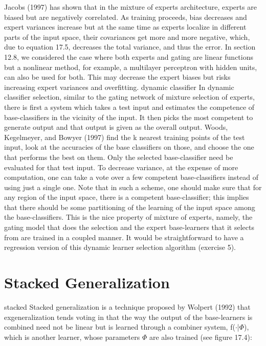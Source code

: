 Jacobs (1997) has shown that in the mixture of experts architecture, experts are biased but are negatively correlated. As training proceeds, bias decreases and expert variances increase but at the same time as experts localize in different parts of the input space, their covariances get more and more negative, which, due to equation 17.5, decreases the total variance, and thus the error. In section 12.8, we considered the case where both experts and gating are linear functions but a nonlinear method, for example, a multilayer perceptron with hidden units, can also be used for both. This may decrease the expert biases but risks increasing expert variances and overfitting. dynamic classifier In dynamic classifier selection, similar to the gating network of mixture selection of experts, there is first a system which takes a test input and estimates the competence of base-classifiers in the vicinity of the input. It then picks the most competent to generate output and that output is given as the overall output. Woods, Kegelmeyer, and Bowyer (1997) find the k nearest training points of the test input, look at the accuracies of the base classifiers on those, and choose the one that performs the best on them. Only the selected base-classifier need be evaluated for that test input. To decrease variance, at the expense of more computation, one can take a vote over a few competent base-classifiers instead of using just a single one. Note that in such a scheme, one should make sure that for any region of the input space, there is a competent base-classifier; this implies that there should be some partitioning of the learning of the input space among the base-classifiers. This is the nice property of mixture of experts, namely, the gating model that does the selection and the expert base-learners that it selects from are trained in a coupled manner. It would be straightforward to have a regression version of this dynamic learner selection algorithm (exercise 5).

\section{Stacked Generalization}

stacked Stacked generalization is a technique proposed by Wolpert (1992) that exgeneralization tends voting in that the way the output of the base-learners is combined need not be linear but is learned through a combiner system, f($\cdot$|$\Phi$), which is another learner, whose parameters $\Phi$ are also trained (see figure 17.4):

